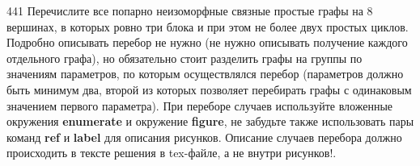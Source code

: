 \begin{task}{441}
Перечислите все попарно неизоморфные связные простые графы на \(8\) вершинах, в которых ровно три блока и при этом не более двух простых циклов. Подробно описывать перебор не нужно (не нужно описывать получение каждого отдельного графа), но обязательно стоит разделить графы на группы по значениям параметров, по которым осуществлялся перебор (параметров должно быть минимум два, второй из которых позволяет перебирать графы с одинаковым значением первого параметра). При переборе случаев используйте вложенные окружения \textbf{enumerate} и окружение \textbf{figure}, не забудьте также использовать пары команд \textbf{ref} и \textbf{label} для описания рисунков. Описание случаев перебора должно происходить в тексте решения в tex-файле, а не внутри рисунков!. 
\end{task}
